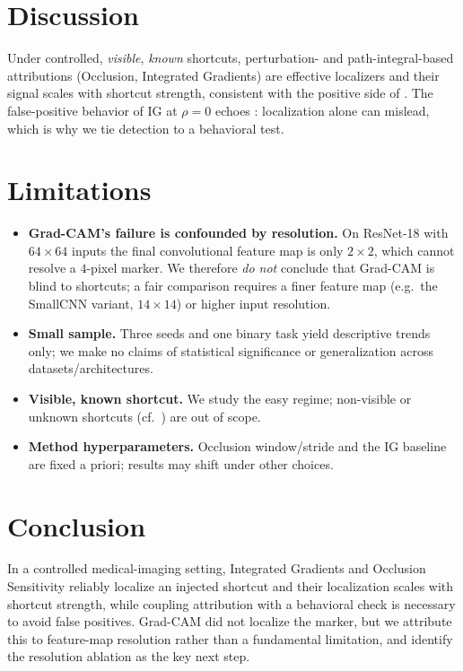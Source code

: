 \documentclass[11pt]{article}
\begin{document}
\section{Discussion}
\label{sec:discussion}
Under controlled, \emph{visible}, \emph{known} shortcuts, perturbation- and path-integral-based
attributions (Occlusion, Integrated Gradients) are effective localizers and their signal scales
with shortcut strength, consistent with the positive side of \citet{adebayo2020debugging}. The
false-positive behavior of IG at $\rho=0$ echoes \citet{adebayo2022posthoc}: localization alone can
mislead, which is why we tie detection to a behavioral test.

\section{Limitations}
\label{sec:limitations}
\begin{itemize}
  \item \textbf{Grad-CAM's failure is confounded by resolution.} On ResNet-18 with $64\times64$
  inputs the final convolutional feature map is only $2\times2$, which cannot resolve a $4$-pixel
  marker. We therefore \emph{do not} conclude that Grad-CAM is blind to shortcuts; a fair comparison
  requires a finer feature map (e.g.\ the SmallCNN variant, $14\times14$) or higher input resolution.
  \item \textbf{Small sample.} Three seeds and one binary task yield descriptive trends only; we make
  no claims of statistical significance or generalization across datasets/architectures.
  \item \textbf{Visible, known shortcut.} We study the easy regime; non-visible or unknown shortcuts
  (cf.\ \citet{adebayo2022posthoc}) are out of scope.
  \item \textbf{Method hyperparameters.} Occlusion window/stride and the IG baseline are fixed a
  priori; results may shift under other choices.
\end{itemize}

\section{Conclusion}
\label{sec:conclusion}
In a controlled medical-imaging setting, Integrated Gradients and Occlusion Sensitivity reliably
localize an injected shortcut and their localization scales with shortcut strength, while coupling
attribution with a behavioral check is necessary to avoid false positives. Grad-CAM did not localize
the marker, but we attribute this to feature-map resolution rather than a fundamental limitation,
and identify the resolution ablation as the key next step.



\end{document}
